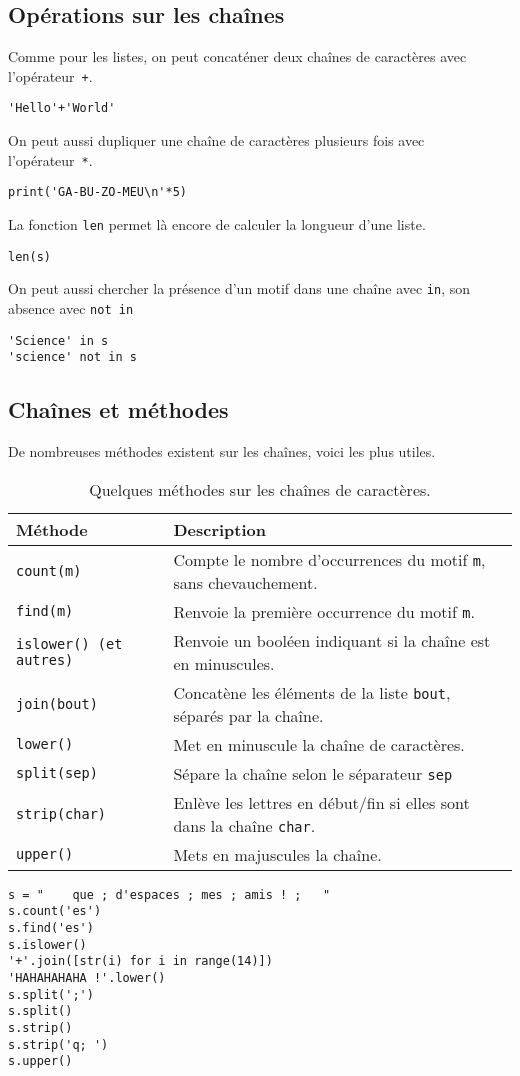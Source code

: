 \subsection{Opérations sur les chaînes}

Comme pour les listes, on peut concaténer deux chaînes de caractères avec l'opérateur~\texttt{+}.
\begin{lstlisting}
'Hello'+'World'
\end{lstlisting}
On peut aussi dupliquer une chaîne de caractères plusieurs fois avec l'opérateur~\texttt{*}.
\begin{lstlisting}
print('GA-BU-ZO-MEU\n'*5)
\end{lstlisting}
La fonction \texttt{len} permet là encore de calculer la longueur d'une liste.
\begin{lstlisting}
len(s)
\end{lstlisting}
On peut aussi chercher la présence d'un motif dans une chaîne avec \texttt{in}, son absence avec \texttt{not in}
\begin{lstlisting}
'Science' in s
'science' not in s
\end{lstlisting}



\subsection{Chaînes et méthodes}
De nombreuses méthodes existent sur les chaînes, voici les plus utiles.
\begin{table}[!h]
  \begin{center}
    \begin{tabular}{lp{8cm}}
      \hline
      \textbf{Méthode} & \textbf{Description} \\ \hline
      \texttt{count(m)}& Compte le nombre d'occurrences du motif \texttt{m}, sans chevauchement.\\
      \texttt{find(m)}& Renvoie la première occurrence du motif \texttt{m}.\\
      \texttt{islower() (et autres)}& Renvoie un booléen indiquant si la chaîne est en minuscules. \\
      \texttt{join(bout)}& Concatène les éléments de la liste \texttt{bout}, séparés par la chaîne.\\
      \texttt{lower()}& Met en minuscule la chaîne de caractères.\\
      \texttt{split(sep)}& Sépare la chaîne selon le séparateur \texttt{sep}\\
      \texttt{strip(char)}& Enlève les lettres en début/fin si elles sont dans la chaîne \texttt{char}.\\
      \texttt{upper()}& Mets en majuscules la chaîne.  \\
      \hline
    \end{tabular}
   \caption{Quelques méthodes sur les chaînes de caractères.}
  \end{center}
\end{table}

\begin{lstlisting}
s = "    que ; d'espaces ; mes ; amis ! ;   "
s.count('es')
s.find('es')
s.islower()
'+'.join([str(i) for i in range(14)])
'HAHAHAHAHA !'.lower()
s.split(';')
s.split()
s.strip()
s.strip('q; ')
s.upper()
\end{lstlisting}
